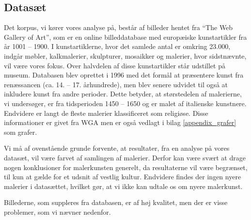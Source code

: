 {\subsection{Datasæt}
Det korpus, vi kører vores analyse på, består af billeder hentet fra
``The Web Gallery of Art''\cite{wgahu}, som er en online billeddatabase med
europæiske kunstartikler fra år 1001 -- 1900. I kunstartiklerne, hvor
det samlede antal er omkring 23.000, indgår møbler, kalkmalerier,
skulpturer, mosaikker og malerier, hvor sidstnævnte, vil være vores
fokus. Over halvdelen af disse kunstartikler står udstillet på museum.
Databasen blev oprettet i 1996 med det formål at præsentere kunst fra
renæssancen (ca.  14. -- 17.  århundrede), men blev senere udvidet til
også at inkludere kunst fra andre perioder. Dette betyder, at
størstedelen af malerierne, vi undersøger, er fra tidsperioden 1450 --
1650 og er malet af italienske kunstnere. Endvidere er langt de fleste
malerier klassificeret som religiøse.  Disse informationer er givet fra
WGA men er også vedlagt i bilag \ref{appendix_grafer} som
grafer.

Vi må af ovenstående grunde forvente, at resultater, fra en analyse på
vores datasæt, vil være farvet af samlingen af malerier. Derfor kan være
svært at drage nogen konklusioner for malerkunsten generelt, da
resultaterne vil være begrænset, til kun at gælde for et udsnit af
vestlig kultur. Endvidere findes der ingen nyere malerier i datasættet,
hvilket gør, at vi ikke kan udtale os om nyere malerkunst.

Billederne, som suppleres fra databasen, er af høj kvalitet, men der er
visse problemer, som vi nævner nedenfor.

}
